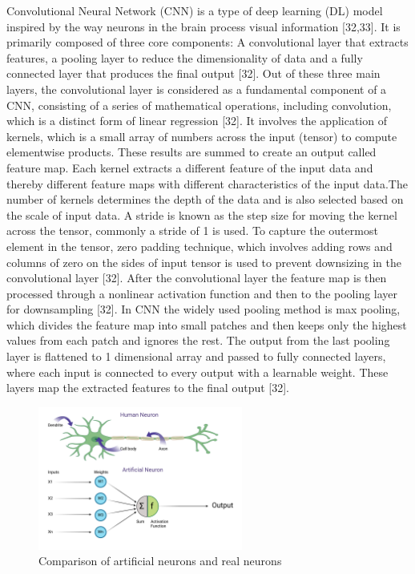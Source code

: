 \documentclass[12pt,a4paper]{article}
\begin{document}
Convolutional Neural Network (CNN) is a type of deep learning (DL) model inspired by the way neurons in the brain process visual information [32,33]. It is primarily composed of three core components: A convolutional layer that extracts features, a pooling layer to reduce the 
dimensionality of data and a fully connected layer that produces the final output [32]. Out of these three main layers, the convolutional layer is considered as a fundamental component of a CNN, consisting of a series of mathematical operations, including convolution, which is 
a distinct form of linear regression [32]. It involves the application of kernels, which is a small array of numbers across the input (tensor) to compute elementwise products. These results are summed to create an output called feature map. Each kernel extracts a different feature 
of the input data and thereby different feature maps with different characteristics of the input data.The number of kernels determines the depth of the data and is also selected based on the scale of input data. A stride is known as the step size for moving the kernel across the tensor, 
commonly a stride of 1 is used. To capture the outermost element in the tensor, zero padding technique, which involves adding rows and columns of zero on the sides of input tensor is used to prevent downsizing in the convolutional layer [32]. After the convolutional layer the feature map 
is then processed through a nonlinear activation function and then to the pooling layer for downsampling [32]. In CNN the widely used pooling method is max pooling, which divides the feature map into small patches and then keeps only the highest values from each patch and ignores the rest. 
The output from the last pooling layer is flattened to 1 dimensional array and passed to fully connected layers, where each input is connected to every output with a learnable weight. These layers map the extracted features to the final output [32]. \\

\begin{figure}[h]
    \centering
    \includegraphics[width=0.6\textwidth]{images/neuron.png}
    \caption{Comparison of artificial neurons and real neurons}
    \label{Figure 4}
\end{figure}
\end{document}

